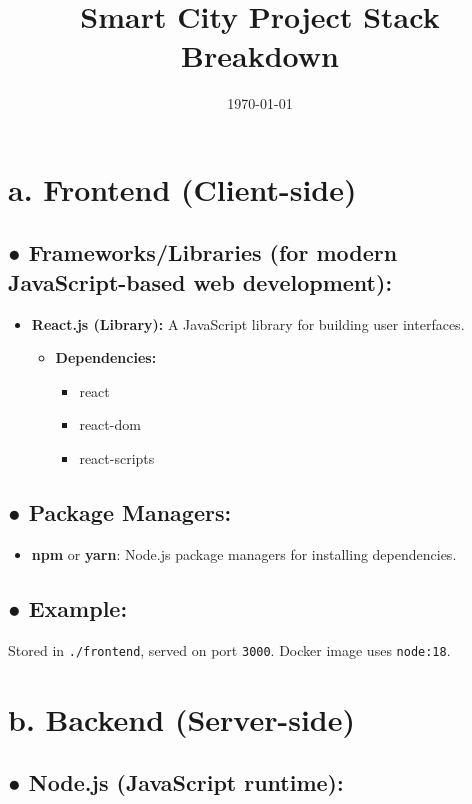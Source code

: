 \documentclass[12pt]{article}
\title{Smart City Project Stack Breakdown}
\author{}
\date{\today}
\begin{document}
\maketitle

\section*{a. Frontend (Client-side)}

\subsection*{● Frameworks/Libraries (for modern JavaScript-based web development):}

\begin{itemize}
  \item \textbf{React.js (Library):} A JavaScript library for building user interfaces.
  \begin{itemize}
    \item \textbf{Dependencies:}
    \begin{itemize}
      \item react
      \item react-dom
      \item react-scripts
    \end{itemize}
  \end{itemize}
\end{itemize}

\subsection*{● Package Managers:}
\begin{itemize}
  \item \textbf{npm} or \textbf{yarn}: Node.js package managers for installing dependencies.
\end{itemize}

\subsection*{● Example:}
Stored in \texttt{./frontend}, served on port \texttt{3000}. Docker image uses \texttt{node:18}.

\section*{b. Backend (Server-side)}

\subsection*{● Node.js (JavaScript runtime):}
\end{document}
